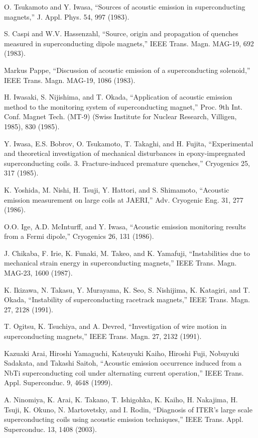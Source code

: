 \noindent [7.42] O. Tsukamoto and Y. Iwasa, ``Sources of acoustic emission in superconducting magnets,” J. Appl. Phys. 54, 997 (1983).

\noindent [7.43] S. Caspi and W.V. Hassenzahl, ``Source, origin and propagation of quenches measured in superconducting dipole magnets,” IEEE Trans. Magn. MAG-19, 692 (1983).

\noindent [7.44] Markus Pappe, ``Discussion of acoustic emission of a superconducting solenoid,” IEEE Trans. Magn. MAG-19, 1086 (1983).

\noindent [7.45] H. Iwasaki, S. Nijishima, and T. Okada, ``Application of acoustic emission method to the monitoring system of superconducting magnet,” Proc. 9th Int. Conf. Magnet Tech. (MT-9) (Swiss Institute for Nuclear Research, Villigen, 1985), 830 (1985).

\noindent [7.46] Y. Iwasa, E.S. Bobrov, O. Tsukamoto, T. Takaghi, and H. Fujita, ``Experimental and theoretical investigation of mechanical disturbances in epoxy-impregnated superconducting coils. 3. Fracture-induced premature quenches,” Cryogenics 25, 317 (1985).

\noindent [7.47] K. Yoshida, M. Nishi, H. Tsuji, Y. Hattori, and S. Shimamoto, ``Acoustic emission measurement on large coils at JAERI,” Adv. Cryogenic Eng. 31, 277 (1986).

\noindent [7.48] O.O. Ige, A.D. McInturff, and Y. Iwasa, ``Acoustic emission monitoring results from a Fermi dipole,” Cryogenics 26, 131 (1986).

\noindent [7.49] J. Chikaba, F. Irie, K. Funaki, M. Takeo, and K. Yamafuji, ``Instabilities due to mechanical strain energy in superconducting magnets,” IEEE Trans. Magn. MAG-23, 1600 (1987).

\noindent [7.50] K. Ikizawa, N. Takasu, Y. Murayama, K. Seo, S. Nishijima, K. Katagiri, and T. Okada, ``Instability of superconducting racetrack magnets,” IEEE Trans. Magn.
27, 2128 (1991).

\noindent [7.51] T. Ogitsu, K. Tsuchiya, and A. Devred, ``Investigation of wire motion in superconducting magnets,” IEEE Trans. Magn. 27, 2132 (1991).

\noindent [7.52] Kazuaki Arai, Hiroshi Yamaguchi, Katsuyuki Kaiho, Hiroshi Fuji, Nobuyuki Sadakata, and Takashi Saitoh, ``Acoustic emission occurrence induced from a NbTi superconducting coil under alternating current operation,” IEEE Trans. Appl. Superconduc. 9, 4648 (1999).

\noindent [7.53] A. Ninomiya, K. Arai, K. Takano, T. Ishigohka, K. Kaiho, H. Nakajima, H. Tsuji, K. Okuno, N. Martovetsky, and I. Rodin, ``Diagnosis of ITER’s large scale superconducting coils using acoustic emission techniques,” IEEE Trans. Appl. Superconduc. 13, 1408 (2003).

